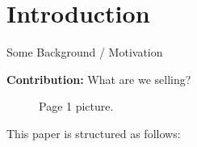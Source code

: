\section{Introduction}
Some Background / Motivation

\textbf{Contribution:} What are we selling?
\begin{figure}[t]
\label{fig:page1}
\caption{Page 1 picture.}
\end{figure}




This paper is structured as follows:
